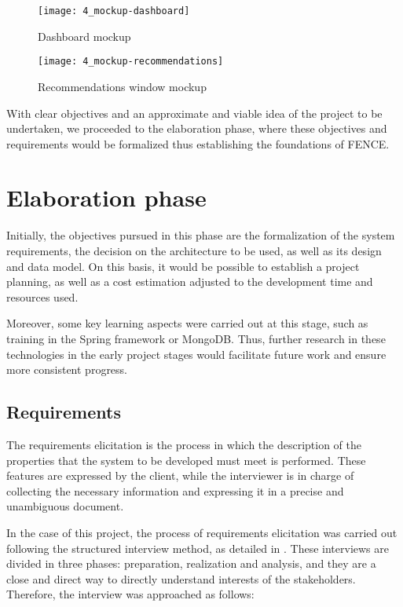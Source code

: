 \begin{figure}
	\centering
	\texttt{[image: 4\_mockup-dashboard]}
	\caption[Dashboard mockup]{Dashboard mockup}
	\label{fig:dash_mockup}
\end{figure}

\begin{figure}
	\centering
	\texttt{[image: 4\_mockup-recommendations]}
	\caption[Recommendations window mockup]{Recommendations window mockup}
	\label{fig:rec_mockup}
\end{figure}

With clear objectives and an approximate and viable idea of the project to be undertaken, we proceeded to the elaboration phase, where these objectives and requirements would be formalized thus establishing the foundations of FENCE.

\section{Elaboration phase}

Initially, the objectives pursued in this phase are the formalization of the system requirements, the decision on the architecture to be used, as well as its design and data model. On this basis, it would be possible to establish a project planning, as well as a cost estimation adjusted to the development time and resources used.

Moreover, some key learning aspects were carried out at this stage, such as training in the Spring framework or MongoDB. Thus, further research in these technologies in the early project stages would facilitate future work and ensure more consistent progress.

\subsection{Requirements}

The requirements elicitation is the process in which the description of the properties that the system to be developed must meet is performed. These features are expressed by the client, while the interviewer is in charge of collecting the necessary information and expressing it in a precise and unambiguous document.

In the case of this project, the process of requirements elicitation was carried out following the structured interview method, as detailed in \cite{toro_metodologia_2000}. These interviews are divided in three phases: preparation, realization and analysis, and they are a close and direct way to directly understand interests of the stakeholders. Therefore, the interview was approached as follows:

